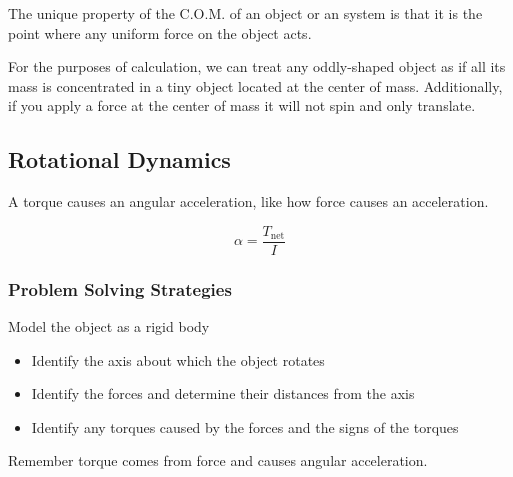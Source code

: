 The unique property of the C.O.M.  of an object or an system is that it
is the point where any uniform force on the object acts.

For the purposes of calculation, we can treat any oddly-shaped object as
if all its mass is concentrated in a tiny object located at the center
of mass.  Additionally, if you apply a force at the center of mass it
will not spin and only translate.

\subsection{Rotational Dynamics}

A torque causes an angular acceleration, like how force causes an
acceleration.

\begin{equation}
    \alpha = \frac{T_\mathrm{net}}{I}
\end{equation}

\subsubsection{Problem Solving Strategies}

Model the object as a rigid body

\begin{itemize}
    \item
        Identify the axis about which the object rotates
    \item
        Identify the forces and determine their distances from the axis
    \item
        Identify any torques caused by the forces and the signs of the
        torques
\end{itemize}

Remember torque comes from force and causes angular acceleration.
